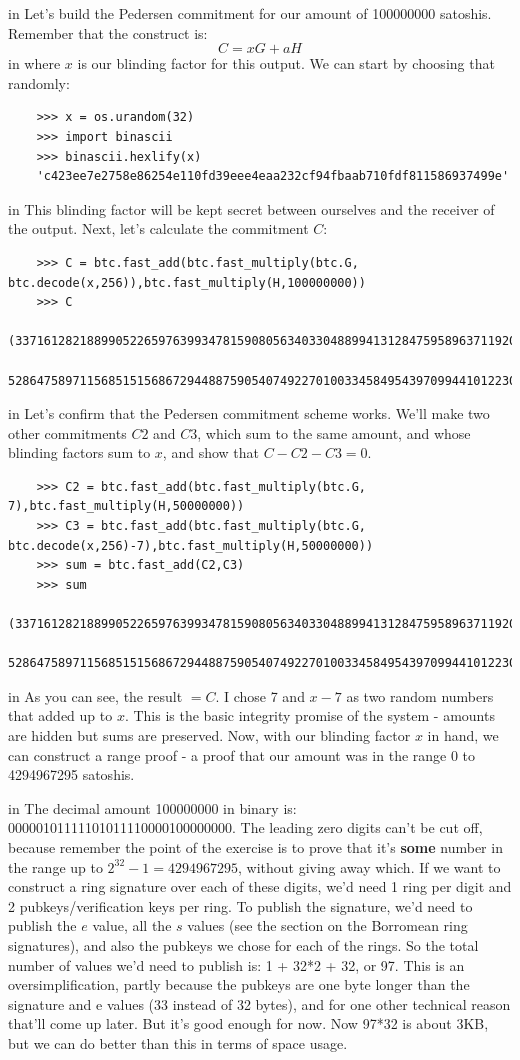 \documentclass[10pt,a4paper]{article}
\begin{document}
 in \noindent Let's build the Pedersen commitment for our amount of 100000000 satoshis. Remember that the construct is:
\[C = xG + aH \]
 in \noindent where $x$ is our blinding factor for this output. We can start by choosing that randomly:
\begin{verbatim}
	>>> x = os.urandom(32)
	>>> import binascii
	>>> binascii.hexlify(x)
	'c423ee7e2758e86254e110fd39eee4eaa232cf94fbaab710fdf811586937499e'
\end{verbatim}

 in \noindent This blinding factor will be kept secret between ourselves and the receiver of the output. Next, let's calculate the commitment $C$:
\begin{verbatim}
	>>> C = btc.fast_add(btc.fast_multiply(btc.G, btc.decode(x,256)),btc.fast_multiply(H,100000000))
	>>> C
	(33716128218899052265976399347815908056340330488994131284759589637119207433518L,
     52864758971156851515686729448875905407492270100334584954397099441012230985012L)
\end{verbatim}

 in \noindent Let's confirm that the Pedersen commitment scheme works. We'll make two other commitments $C2$ and $C3$, which sum to the same amount, and whose blinding factors sum to $x$, and show that $C - C2 - C3 = 0$.
\begin{verbatim}
	>>> C2 = btc.fast_add(btc.fast_multiply(btc.G, 7),btc.fast_multiply(H,50000000))
	>>> C3 = btc.fast_add(btc.fast_multiply(btc.G, btc.decode(x,256)-7),btc.fast_multiply(H,50000000))
	>>> sum = btc.fast_add(C2,C3)
	>>> sum
	(33716128218899052265976399347815908056340330488994131284759589637119207433518L,
    52864758971156851515686729448875905407492270100334584954397099441012230985012L)
\end{verbatim}

 in \noindent As you can see, the result $= C$. I chose 7 and $x-7$ as two random numbers that added up to $x$. This is the basic integrity promise of the system - amounts are hidden but sums are preserved. Now, with our blinding factor $x$ in hand, we can construct a range proof - a proof that our amount was in the range 0 to 4294967295 satoshis.

 in \noindent The decimal amount 100000000 in binary is: 00000101111101011110000100000000. The leading zero digits can't be cut off, because remember the point of the exercise is to prove that it's \textbf{some} number in the range up to $2^{32} -1 = 4294967295$, without giving away which. If we want to construct a ring signature over each of these digits, we'd need 1 ring per digit and 2 pubkeys/verification keys per ring. To publish the signature, we'd need to publish the $e$ value, all the $s$ values (see the section on the Borromean ring signatures), and also the pubkeys we chose for each of the rings. So the total number of values we'd need to publish is: 1 + 32*2 + 32, or 97. This is an oversimplification, partly because the pubkeys are one byte longer than the signature and e values (33 instead of 32 bytes), and for one other technical reason that'll come up later. But it's good enough for now. Now 97*32 is about 3KB, but we can do better than this in terms of space usage.
\end{document}
